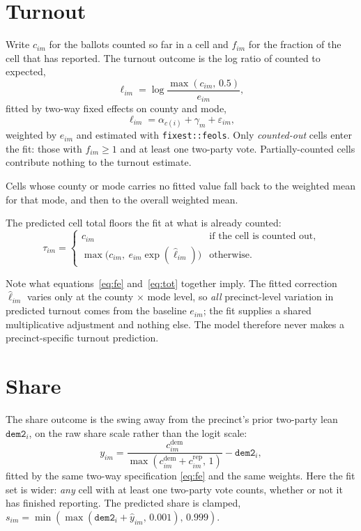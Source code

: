 \documentclass[11pt]{article}
\newcommand{\dem}{\mathrm{dem}}
\newcommand{\rep}{\mathrm{rep}}
\newcommand{\var}[1]{\texttt{#1}}
\begin{document}
\section{Turnout}

Write $c_{im}$ for the ballots counted so far in a cell and $f_{im}$ for the fraction of
the cell that has reported. The turnout outcome is the log ratio of counted to expected,
\begin{equation}
  \ell_{im} = \log \frac{\max(c_{im},\, 0.5)}{e_{im}},
  \label{eq:lr}
\end{equation}
fitted by two-way fixed effects on county and mode,
\begin{equation}
  \ell_{im} = \alpha_{c(i)} + \gamma_m + \varepsilon_{im},
  \label{eq:fe}
\end{equation}
weighted by $e_{im}$ and estimated with \texttt{fixest::feols}. Only \emph{counted-out}
cells enter the fit: those with $f_{im} \geq 1$ and at least one two-party vote.
Partially-counted cells contribute nothing to the turnout estimate.

Cells whose county or mode carries no fitted value fall back to the weighted mean for
that mode, and then to the overall weighted mean.

The predicted cell total floors the fit at what is already counted:
\begin{equation}
  \tau_{im} =
  \begin{cases}
    c_{im} & \text{if the cell is counted out,}\\[2pt]
    \max\!\big(c_{im},\ e_{im}\exp(\hat\ell_{im})\big) & \text{otherwise.}
  \end{cases}
  \label{eq:tot}
\end{equation}

Note what equations~\eqref{eq:fe} and~\eqref{eq:tot} together imply. The fitted correction
$\hat\ell_{im}$ varies only at the county $\times$ mode level, so \emph{all} precinct-level
variation in predicted turnout comes from the baseline $e_{im}$; the fit supplies a shared
multiplicative adjustment and nothing else. The model therefore never makes a
precinct-specific turnout prediction.

\section{Share}

The share outcome is the swing away from the precinct's prior two-party lean
$\var{dem2}_i$, on the raw share scale rather than the logit scale:
\begin{equation}
  y_{im} = \frac{c^{\dem}_{im}}{\max(c^{\dem}_{im} + c^{\rep}_{im},\, 1)} - \var{dem2}_i,
\end{equation}
fitted by the same two-way specification \eqref{eq:fe} and the same weights. Here the fit
set is wider: \emph{any} cell with at least one two-party vote counts, whether or not it
has finished reporting. The predicted share is clamped,
$s_{im} = \min(\max(\var{dem2}_i + \hat y_{im},\, 0.001),\, 0.999)$.
\end{document}
